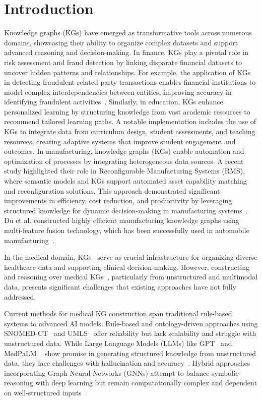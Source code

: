 \documentclass[letterpaper]{article} %
\begin{document}
\section{Introduction}
Knowledge graphs (KGs) have emerged as transformative tools across numerous domains, showcasing their ability to organize complex datasets and support advanced reasoning and decision-making. In finance, KGs play a pivotal role in risk assessment and fraud detection by linking disparate financial datasets to uncover hidden patterns and relationships. For example, the application of KGs in detecting fraudulent related party transactions enables financial institutions to model complex interdependencies between entities, improving accuracy in identifying fraudulent activities~\cite{zhang2023}. Similarly, in education, KGs enhance personalized learning by structuring knowledge from vast academic resources to recommend tailored learning paths. A notable implementation includes the use of KGs to integrate data from curriculum design, student assessments, and teaching resources, creating adaptive systems that improve student engagement and outcomes. In manufacturing, knowledge graphs (KGs) enable automation and optimization of processes by integrating heterogeneous data sources. A recent study highlighted their role in Reconfigurable Manufacturing Systems (RMS), where semantic models and KGs support automated asset capability matching and reconfiguration solutions. This approach demonstrated significant improvements in efficiency, cost reduction, and productivity by leveraging structured knowledge for dynamic decision-making in manufacturing systems~\cite{mo2024semantic}. Du et al. constructed highly efficient manufacturing knowledge graphs using multi-feature fusion technology, which has been successfully used in automobile manufacturing~\cite{DU2022109703}.


In the medical domain, KGs~\cite{abdulla2023,alam2023automated,wu2024medical} serve as crucial infrastructure for organizing diverse healthcare data and supporting clinical decision-making. However, constructing and reasoning over medical KGs~\cite{abdulla2023,al2024patient}, particularly from unstructured and multimodal data, presents significant challenges that existing approaches have not fully addressed.

Current methods for medical KG construction span traditional rule-based systems to advanced AI models. Rule-based and ontology-driven approaches using SNOMED-CT~\cite{chang2021use} and UMLS~\cite{amos2020umls} offer reliability but lack scalability and struggle with unstructured data. While Large Language Models (LLMs) like GPT~\cite{openai2022chatgpt,openai2023gpt4,touvron2023llama,garcia2024medical} and MedPaLM ~\cite{qian2024liver} show promise in generating structured knowledge from unstructured data, they face challenges with hallucination and accuracy~\cite{huang2023survey,tonmoy2024comprehensive,guo2024large}. Hybrid approaches incorporating Graph Neural Networks (GNNs) attempt to balance symbolic reasoning with deep learning but remain computationally complex and dependent on well-structured inputs~\cite{zhang2021knowledge,zhang2024adaptive,shuifa2023review}.
\end{document}
